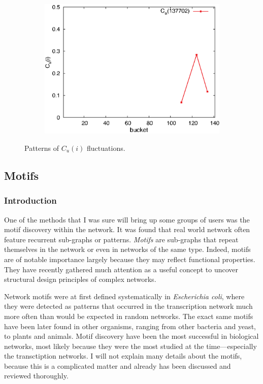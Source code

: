 \begin{figure}[H]
\begin{subfigure}[b]{0.32\textwidth}
          \includegraphics[width=\textwidth]{chapters/03_implementation/u137702}
        \end{subfigure}
        \caption{Patterns of $C_u(i)$ fluctuations.}
        \label{fig:cs_fluctuations}
      \end{figure}

  \subsection{Motifs}
  
    \subsubsection{Introduction}
      
      One of the methods that I was sure will bring up some groups of users was the motif discovery within the network. It was found that real world network often feature recurrent sub-graphs or patterns. \emph{Motifs} are sub-graphs that repeat themselves in the network or even in networks of the same type. Indeed, motifs are of notable importance largely because they may reflect functional properties. They have recently gathered much attention as a useful concept to uncover structural design principles of complex networks\cite{MasoudiSchreiberKashani2012}.
      
      Network motifs were at first defined systematically in \emph{Escherichia coli}, where they were detected as patterns that occurred in the transcription network much more often than would be expected in random networks\cite{MiloAlon2002}. The exact same motifs have been later found in other organisms, ranging from other bacteria\cite{ManganZaslaverAlon2003,Eichenberger2004} and yeast\cite{MiloAlon2002, Lee2002}, to plants\cite{Saddic2006} and animals\cite{Boyer2005}. Motif discovery have been the most successful in biological networks, most likely because they were the most studied at the time---especially the transctiption networks. I will not explain many details about the motifs, because this is a complicated matter and already has been discussed and reviewed thoroughly\cite{Alon2007}.
      
